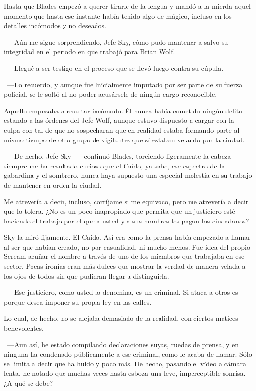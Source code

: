 Hasta que Blades empezó a querer tirarle de la lengua y mandó a la mierda aquel momento que hasta ese instante había tenido algo de mágico, incluso en los detalles incómodos y no deseados.

~---Aún me sigue sorprendiendo, Jefe Sky, cómo pudo mantener a salvo su integridad en el periodo en que trabajó para Brian Wolf.

~---Llegué a ser testigo en el proceso que se llevó luego contra su cúpula.

~---Lo recuerdo, y aunque fue inicialmente imputado por ser parte de su fuerza policial, se le soltó al no poder acusársele de ningún cargo reconocible.

Aquello empezaba a resultar incómodo. Él nunca había cometido ningún delito estando a las órdenes del Jefe Wolf, aunque estuvo dispuesto a cargar con la culpa con tal de que no sospecharan que en realidad estaba formando parte al mismo tiempo de otro grupo de vigilantes que sí estaban velando por la ciudad.

~---De hecho, Jefe Sky ~---continuó Blades, torciendo ligeramente la cabeza~--- siempre me ha resultado curioso que el Caído, ya sabe, ese espectro de la gabardina y el sombrero, nunca haya supuesto una especial molestia en su trabajo de mantener en orden la ciudad.

\rquoti Me atrevería a decir, incluso, corríjame si me equivoco, pero me atrevería a decir que lo tolera. ¿No es un poco inapropiado que permita que un justiciero esté haciendo el trabajo por el que a usted y a sus hombres les pagan los ciudadanos?

Sky la miró fijamente. El Caído. Así era como la prensa había empezado a llamar al ser que habían creado, no por casualidad, ni mucho menos. Fue idea del propio Scream acuñar el nombre a través de uno de los miembros que trabajaba en ese sector. Pocas ironías eran más dulces que mostrar la verdad de manera velada a los ojos de todos sin que pudieran llegar a distinguirla.

~---Ese justiciero, como usted lo denomina, es un criminal. Si ataca a otros es porque desea imponer su propia ley en las calles.

Lo cual, de hecho, no se alejaba demasiado de la realidad, con ciertos matices benevolentes.

~---Aun así, he estado compilando declaraciones suyas, ruedas de prensa, y en ninguna ha condenado públicamente a ese criminal, como le acaba de llamar. Sólo se limita a decir que ha huido y poco más. De hecho, pasando el vídeo a cámara lenta, he notado que muchas veces hasta esboza una leve, imperceptible sonrisa. ¿A qué se debe?

